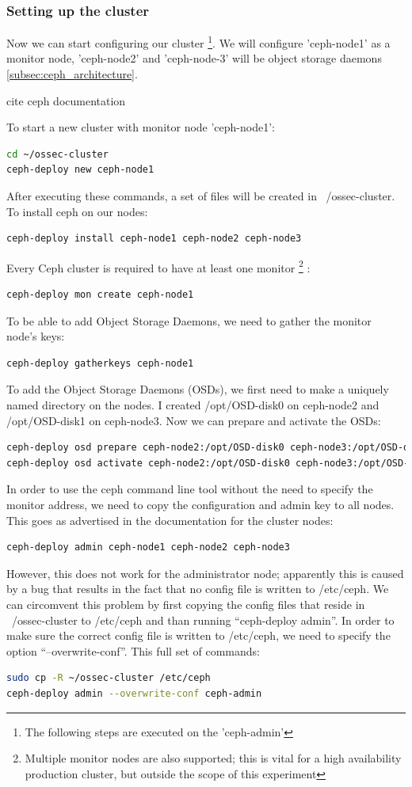 \documentclass[12pt]{report}
\begin{document}
\subsubsection{Setting up the cluster}
Now we can start configuring our cluster \footnote{The following steps are executed on the 'ceph-admin'}.
We will configure 'ceph-node1' as a monitor node, 'ceph-node2' and
'ceph-node-3' will be object storage daemons \ref{subsec:ceph_architecture}.

cite ceph documentation

To start a new cluster with monitor node 'ceph-node1':
\begin{lstlisting}[language=bash]
cd ~/ossec-cluster
ceph-deploy new ceph-node1
\end{lstlisting}
After executing these commands, a set of files will be created in
~/ossec-cluster.
To install ceph on our nodes:
\begin{lstlisting}[language=bash]
ceph-deploy install ceph-node1 ceph-node2 ceph-node3
\end{lstlisting}
Every Ceph cluster is required to have at least one monitor
\footnote{Multiple monitor nodes are also supported; this is vital for a high
  availability production cluster, but outside the scope of this experiment} :
\begin{lstlisting}[language=bash]
ceph-deploy mon create ceph-node1
\end{lstlisting}
To be able to add Object Storage Daemons, we need to gather the
monitor node's
keys:
\begin{lstlisting}[language=bash]
ceph-deploy gatherkeys ceph-node1
\end{lstlisting}
To add the Object Storage Daemons (OSDs), we first need to make a uniquely
named directory on the nodes. I created /opt/OSD-disk0 on ceph-node2 and
/opt/OSD-disk1 on ceph-node3. 
Now we can prepare and activate the OSDs:
\begin{lstlisting}[language=bash]
ceph-deploy osd prepare ceph-node2:/opt/OSD-disk0 ceph-node3:/opt/OSD-disk1
ceph-deploy osd activate ceph-node2:/opt/OSD-disk0 ceph-node3:/opt/OSD-disk1
\end{lstlisting}

In order to use the ceph command line tool without the need to specify
the monitor address, we need to copy the configuration and admin key
to all nodes.
This goes as advertised in the documentation for the cluster nodes:
\begin{lstlisting}[language=bash]
ceph-deploy admin ceph-node1 ceph-node2 ceph-node3 
\end{lstlisting}
However, this does not work for the administrator node; apparently
this is caused by a bug \cite{ceph_bug_1} that results in the fact
that no config file is written to /etc/ceph.
We can circomvent this problem by first copying the config files that
reside in ~/ossec-cluster to /etc/ceph and than running ``ceph-deploy
admin''.
In order to make sure the correct config file is written to /etc/ceph,
we need to specify the option ``--overwrite-conf''.
This full set of commands:
\begin{lstlisting}[language=bash]
sudo cp -R ~/ossec-cluster /etc/ceph
ceph-deploy admin --overwrite-conf ceph-admin
\end{lstlisting}
\end{document}
